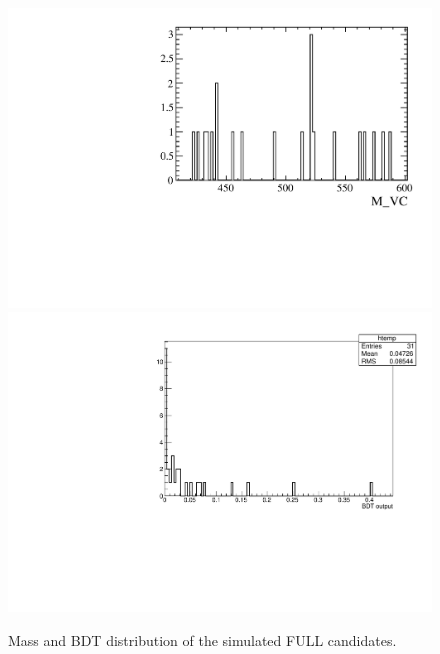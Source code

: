 \begin{figure} [htb!]
\begin{center}
\includegraphics[scale=0.3]{figs/filtered_mass_BDTintegrated.pdf}
\includegraphics[scale=0.30]{figs/K3pi_BDT.pdf}
\caption{Mass and BDT distribution of the \KSTpi simulated FULL candidates.\label{fig:KLTpi_BDT}}
\end{center}
\end{figure}
